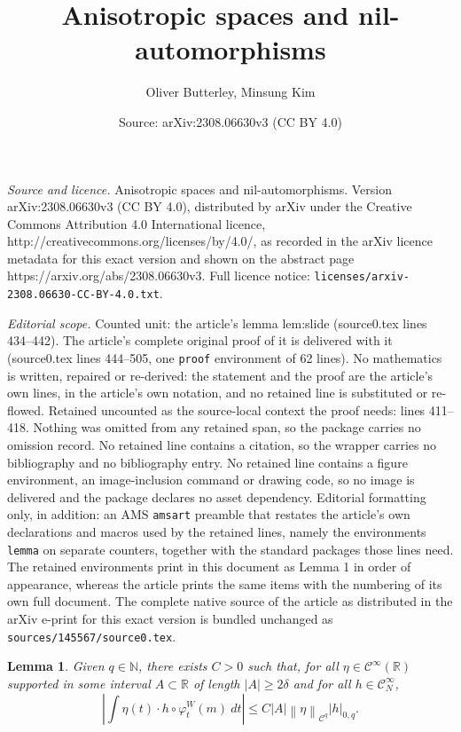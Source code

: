 \documentclass[10pt,a4paper]{amsart}
\title{Anisotropic spaces and nil-automorphisms}
\author{Oliver Butterley, Minsung Kim}
\date{Source: arXiv:2308.06630v3 (CC BY 4.0)}
\newtheorem{lemma}{Lemma}
\newcommand{\abs}[1]{\left|#1\right|} %
\newcommand{\bN}{\mathbb{N}} %
\newcommand{\bR}{\mathbb{R}} %
\newcommand{\cC}{\mathcal{C}} %
\newcommand{\dw}{W} %
\newcommand{\norm}[1]{\left\|#1\right\|} %
\begin{document}
\maketitle

\noindent\emph{Source and licence.} Anisotropic spaces and nil-automorphisms. Version arXiv:2308.06630v3 (CC BY 4.0), distributed by arXiv under the Creative Commons Attribution 4.0 International licence, http://creativecommons.org/licenses/by/4.0/, as recorded in the arXiv licence metadata for this exact version and shown on the abstract page https://arxiv.org/abs/2308.06630v3. Full licence notice: \texttt{licenses/arxiv-2308.06630-CC-BY-4.0.txt}.\par\smallskip

\noindent\textit{Editorial scope.} Counted unit: the article's lemma lem:slide (source0.tex lines 434--442). The article's complete original proof of it is delivered with it (source0.tex lines 444--505, one \texttt{proof} environment of 62 lines). No mathematics is written, repaired or re-derived: the statement and the proof are the article's own lines, in the article's own notation, and no retained line is substituted or re-flowed.  Retained uncounted as the source-local context the proof needs: lines 411--418.  Nothing was omitted from any retained span, so the package carries no omission record.  No retained line contains a citation, so the wrapper carries no bibliography and no bibliography entry.  No retained line contains a figure environment, an image-inclusion command or drawing code, so no image is delivered and the package declares no asset dependency.  Editorial formatting only, in addition: an AMS \texttt{amsart} preamble that restates the article's own declarations and macros used by the retained lines, namely the environments \texttt{lemma} on separate counters, together with the standard packages those lines need.  The retained environments print in this document as Lemma 1 in order of appearance, whereas the article prints the same items with the numbering of its own full document.  The complete native source of the article as distributed in the arXiv e-print for this exact version is bundled unchanged as \texttt{sources/145567/source0.tex}.
\begin{lemma}
    \label{lem:norm-scale}
    Given \(q\in \bN\), there exists \(C>0\) such that, for all \(\eta \in \cC^{\infty}(\bR)\) supported in some interval \(A \subset \bR\) of length \(\abs{A} \geq 2\delta\) and for all \(h\in \cC^{\infty}_{N}\),
    \[
        \abs{\int \eta(t) \cdot  h\circ \varphi_{t}^{\dw}(m) \ dt}
        \leq C \abs{A} \norm{\eta}_{\cC^q} \abs{h}_{0,q}.
    \]
\end{lemma}
\end{document}
